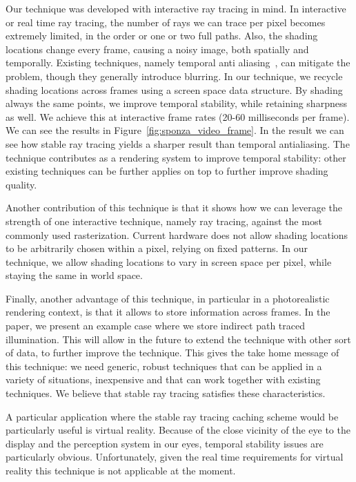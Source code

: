 Our technique was developed with interactive ray tracing in mind. In interactive or real time ray tracing, the number of rays we can trace per pixel becomes extremely limited, in the order or one or two full paths. Also, the shading locations change every frame, causing a noisy image, both spatially and temporally. Existing techniques, namely temporal anti aliasing~\cite{Karis2014}, can mitigate the problem, though they generally introduce blurring. In our technique, we recycle shading locations across frames using a screen space data structure. By shading always the same points, we improve temporal stability, while retaining sharpness as well. We achieve this at interactive frame rates (20-60 milliseconds per frame). We can see the results in Figure~\ref{fig:sponza_video_frame}. In the result we can see how stable ray tracing yields a sharper result than temporal antialiasing. The technique contributes as a rendering system to improve temporal stability: other existing techniques can be further applies on top to further improve shading quality. 

Another contribution of this technique is that it shows how we can leverage the strength of one interactive technique, namely ray tracing, against the most commonly used rasterization. Current hardware does not allow shading locations to be arbitrarily chosen within a pixel, relying on fixed patterns. In our technique, we allow shading locations to vary in screen space per pixel, while staying the same in world space. 

Finally, another advantage of this technique, in particular in a photorealistic rendering context, is that it allows to store information across frames. In the paper, we present an example case where we store indirect path traced illumination. This will allow in the future to extend the technique with other sort of data, to further improve the technique. This gives the take home message of this technique: we need generic, robust techniques that can be applied in a variety of situations, inexpensive and that can work together with existing techniques. We believe that stable ray tracing satisfies these characteristics. 

A particular application where the stable ray tracing caching scheme would be particularly useful is virtual reality. Because of the close vicinity of the eye to the display and the perception system in our eyes, temporal stability issues are particularly obvious. Unfortunately, given the real time requirements for virtual reality this technique is not applicable at the moment.

